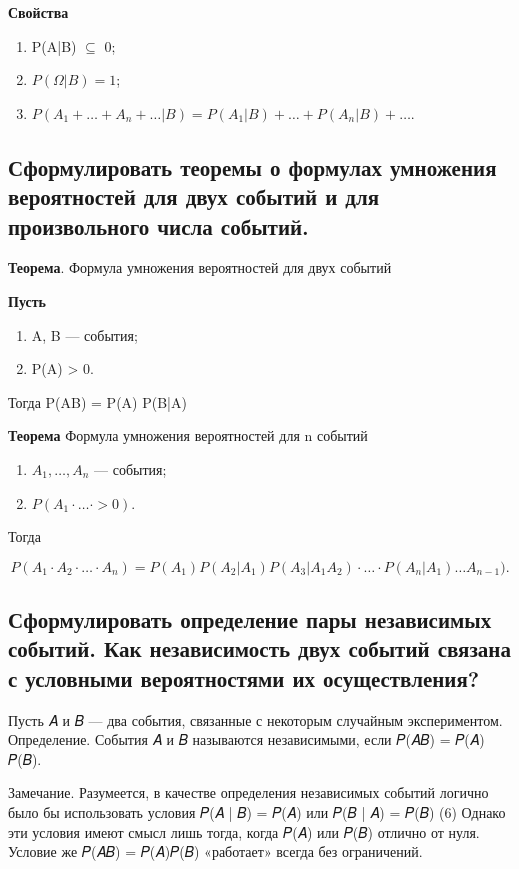 \textbf{Свойства}

\begin{enumerate}
	\item P(A|B) $\subseteq$ 0;
	\item $P(\Omega|B) = 1$;
	\item $P(A_1 + \dots + A_n + \dots | B) = P(A_1|B) + \dots + P(A_n|B) + \dots$.
\end{enumerate}

\subsection{Сформулировать теоремы о формулах умножения вероятностей для двух событий и для произвольного числа событий.}

\textbf{Теорема}. Формула умножения вероятностей для двух событий 

\textbf{Пусть}

\begin{enumerate}
	\item A, B --- события;
	\item P(A) > 0.
\end{enumerate}

Тогда P(AB) = P(A) P(B|A)

\textbf{Теорема} Формула умножения вероятностей для n событий

\begin{enumerate}
	\item $A_1, \dots, A_n$ --- события;
	\item $P(A_1 \cdot \dots \cdot > 0)$.
\end{enumerate}

Тогда 

\begin{equation}
	P(A_1 \cdot A_2 \cdot \dots \cdot A_n)  = P(A_1) P(A_2 | A_1)P(A_3|A_1A_2) \cdot \dots \cdot P(A_n|A_1) \dots   A_{n-1}).
\end{equation}

\subsection{Сформулировать определение пары независимых событий. Как независимость двух событий связана с условными вероятностями их осуществления?}

Пусть 𝐴 и 𝐵 — два события, связанные с некоторым случайным экспериментом.
Определение. События 𝐴 и 𝐵 называются независимыми, если 𝑃(𝐴𝐵) = 𝑃(𝐴) 𝑃(𝐵).

Замечание. Разумеется, в качестве определения независимых событий логично было бы использовать условия 𝑃(𝐴 | 𝐵) = 𝑃(𝐴) или 𝑃(𝐵 | 𝐴) = 𝑃(𝐵) (6) Однако эти условия имеют смысл лишь тогда, когда 𝑃(𝐴) или 𝑃(𝐵) отлично от нуля. Условие же 𝑃(𝐴𝐵) = 𝑃(𝐴)𝑃(𝐵) «работает» всегда без ограничений.

